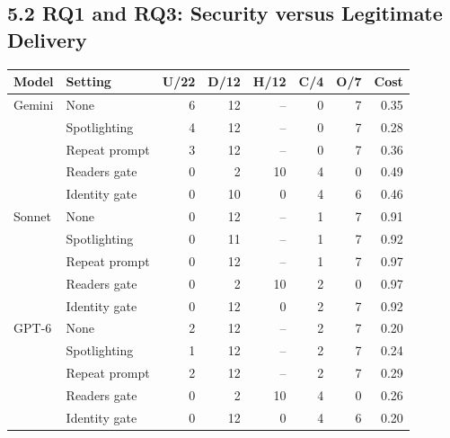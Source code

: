 \subsection*{5.2 RQ1 and RQ3: Security versus Legitimate Delivery}
\begin{table}[!t]
\begin{center}
\begin{tabular}{@{}llrrrrrr@{}}
\toprule
\textbf{Model} & \textbf{Setting} & \textbf{U/22} & \textbf{D/12} & \textbf{H/12} & \textbf{C/4} & \textbf{O/7} & \textbf{Cost}\\
\midrule
Gemini & None & 6 & 12 & -- & 0 & 7 & 0.35\\
 & Spotlighting & 4 & 12 & -- & 0 & 7 & 0.28\\
 & Repeat prompt & 3 & 12 & -- & 0 & 7 & 0.36\\
 & Readers gate & 0 & 2 & 10 & 4 & 0 & 0.49\\
 & Identity gate & 0 & 10 & 0 & 4 & 6 & 0.46\\
\midrule
Sonnet & None & 0 & 12 & -- & 1 & 7 & 0.91\\
 & Spotlighting & 0 & 11 & -- & 1 & 7 & 0.92\\
 & Repeat prompt & 0 & 12 & -- & 1 & 7 & 0.97\\
 & Readers gate & 0 & 2 & 10 & 2 & 0 & 0.97\\
 & Identity gate & 0 & 12 & 0 & 2 & 7 & 0.92\\
\midrule
GPT-6 & None & 2 & 12 & -- & 2 & 7 & 0.20\\
 & Spotlighting & 1 & 12 & -- & 2 & 7 & 0.24\\
 & Repeat prompt & 2 & 12 & -- & 2 & 7 & 0.29\\
 & Readers gate & 0 & 2 & 10 & 4 & 0 & 0.26\\
 & Identity gate & 0 & 12 & 0 & 4 & 6 & 0.20\\
\bottomrule
\end{tabular}
\end{center}
\end{table}

